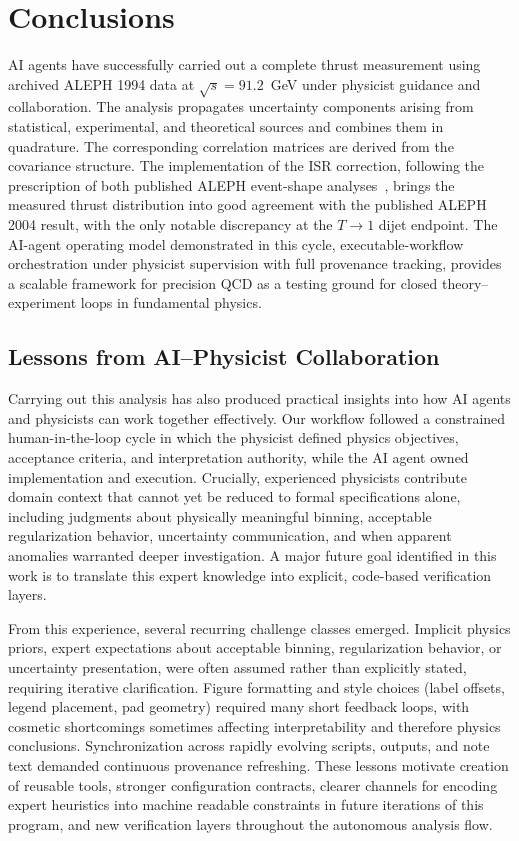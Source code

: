 \section{Conclusions}
\label{sec:conclusion}

AI agents have successfully carried out a complete thrust measurement using archived ALEPH 1994 data at $\sqrt{s}=91.2$~GeV under physicist guidance and collaboration. The analysis propagates uncertainty components arising from statistical, experimental, and theoretical sources and combines them in quadrature. The corresponding correlation matrices are derived from the covariance structure. The implementation of the ISR correction, following the prescription of both published ALEPH event-shape analyses~\cite{Barate:1996fi,Heister:2003aj}, brings the measured thrust distribution into good agreement with the published ALEPH 2004 result, with the only notable
discrepancy at the $T\to 1$ dijet endpoint. The AI-agent operating model demonstrated in this cycle, executable-workflow orchestration under physicist supervision with full
provenance tracking, provides a scalable framework for precision QCD as a testing ground for closed theory--experiment loops in fundamental physics.

\subsection*{Lessons from AI--Physicist Collaboration}

Carrying out this analysis has also produced practical insights into how AI agents and physicists can work together effectively. Our workflow followed a constrained human-in-the-loop cycle in which the physicist defined physics objectives, acceptance criteria, and interpretation authority, while the AI agent owned implementation and execution. Crucially, experienced physicists contribute domain context that cannot yet be reduced to formal specifications alone, including judgments about physically meaningful binning, acceptable regularization behavior, uncertainty communication, and when apparent anomalies warranted deeper investigation. A major future goal identified in this work is to translate this expert knowledge into explicit, code-based verification layers. 

From this experience, several recurring challenge classes emerged. Implicit physics priors, expert expectations about acceptable binning, regularization behavior, or uncertainty presentation, were often assumed rather than explicitly stated, requiring iterative clarification. Figure formatting and style choices (label offsets, legend placement, pad geometry) required many short feedback loops, with cosmetic shortcomings sometimes affecting interpretability and therefore physics conclusions. Synchronization across rapidly evolving scripts, outputs, and note text demanded continuous provenance refreshing. These lessons motivate creation of reusable tools, stronger configuration contracts, clearer channels for encoding expert heuristics into machine readable constraints in future iterations of this program, and new verification layers throughout the autonomous analysis flow.
